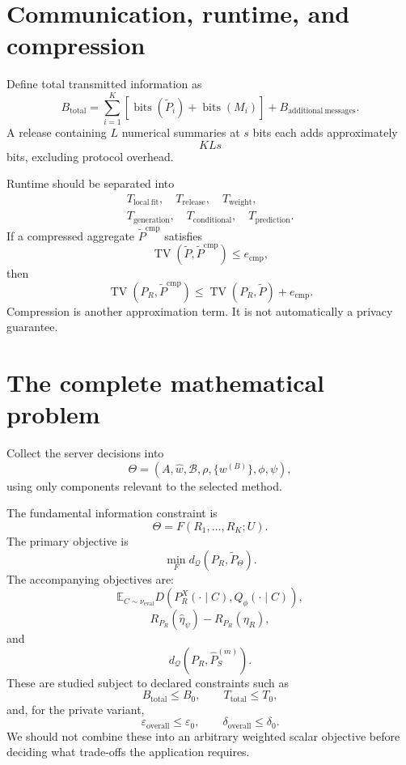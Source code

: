 \documentclass[11pt,a4paper]{article}
\begin{document}
\section{Communication, runtime, and compression}
Define total transmitted information as
\[
\boxed{B_{\mathrm{total}}=\sum_{i=1}^{K}
\left[\operatorname{bits}(\widetilde P_i)+\operatorname{bits}(M_i)\right]
+B_{\mathrm{additional\ messages}}.}
\]
A release containing $L$ numerical summaries at $s$ bits each adds approximately
\[
KLs
\]
bits, excluding protocol overhead.

Runtime should be separated into
\[
\begin{gathered}
T_{\mathrm{local\ fit}},\quad T_{\mathrm{release}},\quad T_{\mathrm{weight}},\\
T_{\mathrm{generation}},\quad T_{\mathrm{conditional}},\quad T_{\mathrm{prediction}}.
\end{gathered}
\]
If a compressed aggregate $\widetilde P^{\mathrm{cmp}}$ satisfies
\[
\operatorname{TV}(\widetilde P,\widetilde P^{\mathrm{cmp}})\leq e_{\mathrm{cmp}},
\]
then
\[
\boxed{\operatorname{TV}(P_R,\widetilde P^{\mathrm{cmp}})
\leq\operatorname{TV}(P_R,\widetilde P)+e_{\mathrm{cmp}}.}
\]
Compression is another approximation term. It is not automatically a privacy guarantee.

\section{The complete mathematical problem}
Collect the server decisions into
\[
\Theta=\left(A,\widehat w,\mathcal B,\rho,\{w^{(B)}\},\phi,\psi\right),
\]
using only components relevant to the selected method.

The fundamental information constraint is
\[
\boxed{\Theta=F(R_1,\ldots,R_K;U).}
\]
The primary objective is
\[
\boxed{\min_F d_{\mathcal Q}\left(P_R,\widetilde P_{\Theta}\right).}
\]
The accompanying objectives are:
\[
\boxed{\mathbb E_{C\sim\nu_{\mathrm{eval}}}
D\left(P_R^X(\cdot\mid C),Q_\phi(\cdot\mid C)\right),}
\]
\[
\boxed{R_{P_R}(\widehat\eta_\psi)-R_{P_R}(\eta_R),}
\]
and
\[
\boxed{d_{\mathcal Q}\left(P_R,\widehat P_S^{(m)}\right).}
\]
These are studied subject to declared constraints such as
\[
B_{\mathrm{total}}\leq B_0,\qquad T_{\mathrm{total}}\leq T_0,
\]
and, for the private variant,
\[
\varepsilon_{\mathrm{overall}}\leq\varepsilon_0,
\qquad\delta_{\mathrm{overall}}\leq\delta_0.
\]
We should not combine these into an arbitrary weighted scalar objective before deciding what trade-offs the application requires.
\end{document}
